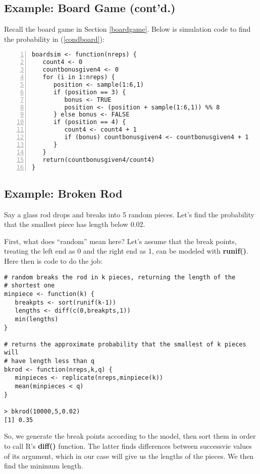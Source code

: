 \subsection{Example: Board Game (cont'd.)}

Recall the board game in Section \ref{boardgame}.  Below is simulation
code to find the probability in (\ref{condboard}):

\begin{Verbatim}[fontsize=\relsize{-2},numbers=left]
boardsim <- function(nreps) {
   count4 <- 0
   countbonusgiven4 <- 0
   for (i in 1:nreps) {
      position <- sample(1:6,1)
      if (position == 3) {
         bonus <- TRUE
         position <- (position + sample(1:6,1)) %% 8
      } else bonus <- FALSE
      if (position == 4) {
         count4 <- count4 + 1
         if (bonus) countbonusgiven4 <- countbonusgiven4 + 1
      }
   }
   return(countbonusgiven4/count4)
}
\end{Verbatim}

\subsection{Example:  Broken Rod}
\label{brokenrod}

Say a glass rod drops and breaks into 5 random pieces.  Let's find the
probability that the smallest piece has length below 0.02.  

First, what does ``random'' mean here?  Let's assume that the break
points, treating the left end as 0 and the right end as 1, can be
modeled with {\bf runif()}.  Here then is code to do the job:

\begin{lstlisting}
# random breaks the rod in k pieces, returning the length of the
# shortest one
minpiece <- function(k) {
   breakpts <- sort(runif(k-1))
   lengths <- diff(c(0,breakpts,1))
   min(lengths)
}

# returns the approximate probability that the smallest of k pieces will
# have length less than q
bkrod <- function(nreps,k,q) {
   minpieces <- replicate(nreps,minpiece(k))
   mean(minpieces < q) 
}

> bkrod(10000,5,0.02) 
[1] 0.35
\end{lstlisting}

So, we generate the break points according to the model, then sort them
in order to call R's {\bf diff()} function.  The latter finds
differences between successvie values of its argument, which in our case
will give us the lengths of the pieces.  We then find the minimum
length.

